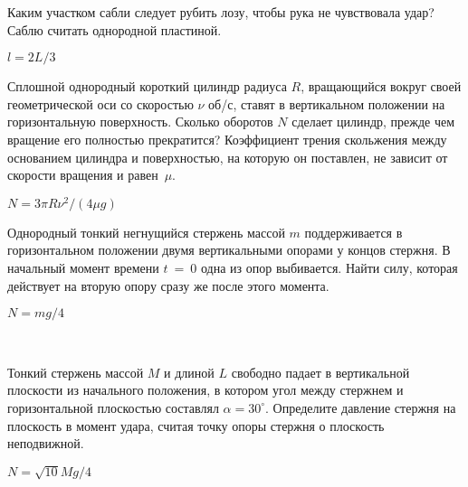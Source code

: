 \begin{ex}
Каким участком сабли следует рубить лозу, чтобы рука не чувствовала удар? Саблю считать однородной пластиной.
\begin{ans}
$l=2L/3$
\end{ans}
\end{ex}

\begin{ex}
Сплошной однородный короткий цилиндр радиуса $R$, вращающийся вокруг своей геометрической оси со скоростью $\nu$ об/с, ставят в вертикальном положении на горизонтальную поверхность. Сколько оборотов $N$ сделает цилиндр, прежде чем вращение его полностью прекратится? Коэффициент трения скольжения между основанием цилиндра и поверхностью, на которую он поставлен, не зависит от скорости вращения и равен~$\mu$.
\begin{ans}
$N=3 \pi R \nu^2/(4\mu g)$
\end{ans}
\end{ex}

\begin{ex}
Однородный тонкий негнущийся стержень массой $m$ поддерживается в горизонтальном положении двумя вертикальными опорами у концов стержня. В начальный момент времени $t~=~0$ одна из опор выбивается. Найти силу, которая действует на вторую опору сразу же после этого момента.
\begin{center}

\end{center}
\begin{ans}
$N = mg/4$
\end{ans}
\end{ex}

\begin{ex}
\hspace{0pt} \\
\begin{minipage}{.65\textwidth}
Тонкий стержень массой $M$ и длиной $L$ свободно падает в вертикальной плоскости из начального положения, в котором угол между стержнем и горизонтальной плоскостью составлял $\alpha = 30^{\circ}$. Определите давление стержня на плоскость в момент удара, считая точку опоры стержня о плоскость неподвижной.
\end{minipage}
\begin{minipage}{.35\textwidth}
\centering

\end{minipage}
\begin{ans}
$N=\sqrt{10}Mg/4$
\end{ans}
\end{ex}

